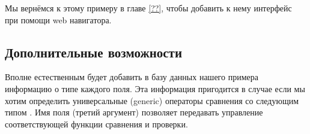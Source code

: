 Мы вернёмся к этому примеру в главе \ref{??}, чтобы добавить к нему интерфейс 
при помощи web навигатора.

\subsection{Дополнительные возможности}
\label{subsec:further_work}

Вполне естественным будет добавить в базу данных нашего примера информацию о 
типе каждого поля. Эта информация пригодится в случае если мы хотим определить 
универсальные (generic) операторы сравнения со следующим типом . Имя поля (третий аргумент) позволяет 
передавать управление соответствующей функции сравнения и проверки. 
